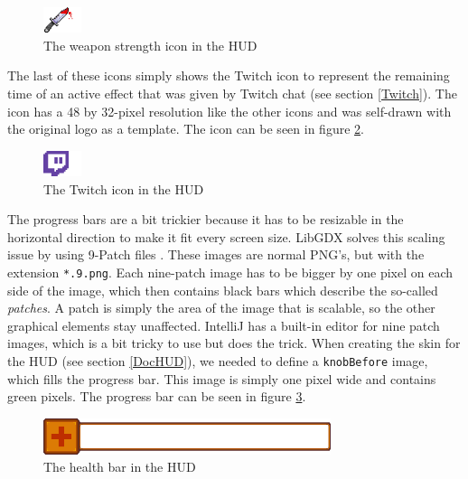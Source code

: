 \documentclass[12p]{article}
\begin{document}
\begin{figure}[ht]
 \center
 \includegraphics[width=0.1\textwidth]{Documentation/weapon_strength_icon.png}
 \caption{The weapon strength icon in the HUD}
 \label{fig:hud_weapon_strength_icon}
\end{figure}

The last of these icons simply shows the Twitch icon to represent the remaining time of an active effect that was given by Twitch chat (see section \ref{Twitch}). The icon has a 48 by 32-pixel resolution like the other icons and was self-drawn with the original logo as a template. The icon can be seen in figure \ref{fig:hud_twitch_icon}.

\begin{figure}[ht]
 \center
 \includegraphics[width=0.1\textwidth]{Documentation/twitch.png}
 \caption{The Twitch icon in the HUD}
 \label{fig:hud_twitch_icon}
\end{figure}

The progress bars are a bit trickier because it has to be resizable in the horizontal direction to make it fit every screen size. LibGDX solves this scaling issue by using 9-Patch files \cite{NinePatchImage}. These images are normal PNG's, but with the extension \texttt{*.9.png}. Each nine-patch image has to be bigger by one pixel on each side of the image, which then contains black bars which describe the so-called \emph{patches}. A patch is simply the area of the image that is scalable, so the other graphical elements stay unaffected. IntelliJ has a built-in editor for nine patch images, which is a bit tricky to use but does the trick. When creating the skin for the HUD (see section \ref{DocHUD}), we needed to define a \texttt{knobBefore} image, which fills the progress bar. This image is simply one pixel wide and contains green pixels. The progress bar can be seen in figure \ref{fig:hud_health_bar}.

\begin{figure}[ht]
 \center
 \includegraphics[width=0.75\textwidth]{Documentation/healthbar.png}
 \caption{The health bar in the HUD}
 \label{fig:hud_health_bar}
\end{figure}
\end{document}
